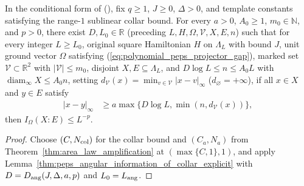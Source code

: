 \begin{lemma}
    \label{thm:peps_angular_information_of_collar}
    \leanok
    In the conditional form of
    \cite[Proposition~3.4]{OpenAI2026PolynomialPEPS} (\cite{gap:polypeps_angular_annular_geometry_scope}), fix
    $q\ge1$, $J\ge0$, $\Delta>0$, and template constants satisfying the range-$1$ sublinear collar bound.
    For every $a>0$, $A_0\ge1$, $m_0\in\mathbb N$, and $p>0$, there exist $D,L_0\in\mathbb R$ (preceding $L,H,\Omega,\mathcal V,X,E,n$) such that for every integer $L\ge L_0$, original square Hamiltonian $H$ on $\Lambda_L$ with bound $J$, unit ground vector $\Omega$ satisfying (\ref{eq:polynomial_peps_projector_gap}), marked set $\mathcal V\subset\mathbb R^2$ with $|\mathcal V|\le m_0$, disjoint $X,E\subseteq\Lambda_L$, and $D\log L\le n\le A_0L$ with $\operatorname{diam}_\infty X\le A_0n$, setting $d_{\mathcal V}(x)=\min_{v\in\mathcal V}|x-v|_\infty$ ($d_{\varnothing}=+\infty$), if all $x\in X$ and $y\in E$ satisfy
    \begin{align}
        |x-y|_\infty
         & \ge a\max\{D\log L,\min(n,d_{\mathcal V}(x))\},
        \label{eq:peps_angular_separation_condition}
    \end{align}
    then $I_\Omega(X:E)\le L^{-p}$.
\end{lemma}
\begin{proof}\leanok
    Choose $(C,N_{\rm col})$ for the collar bound and $(C_a,N_a)$ from Theorem~\ref{thm:area_law_amplification} at $(\max\{C,1\},1)$, and apply
    Lemma~\ref{thm:peps_angular_information_of_collar_explicit} with $D=D_{\rm ang}(J,\Delta,a,p)$ and $L_0=L_{\rm ang}$.
\end{proof}
